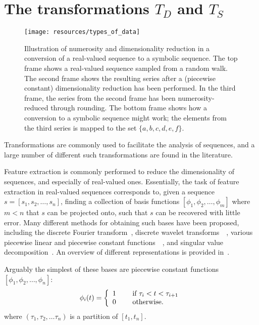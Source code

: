 \section{The transformations \texorpdfstring{$T_D$}{TD} and \texorpdfstring{$T_S$}{TS}}

\begin{figure}[htb]
  \begin{center}
    \leavevmode
    \texttt{[image: resources/types\_of\_data]}
  \end{center}
  \caption{\small{Illustration of numerosity and dimensionality reduction in a conversion of a real-valued sequence to a symbolic sequence. The top frame shows a real-valued sequence sampled from a random walk. The second frame shows the resulting series after a (piecewise constant) dimensionality reduction has been performed. In the third frame, the series from the second frame has been numerosity-reduced through rounding. The bottom frame shows how a conversion to a symbolic sequence might work; the elements from the third series is mapped to the set $\{a,b,c,d,e,f\}$.}}
\label{fig:types_of_data}
\end{figure}

Transformations are commonly used to facilitate the analysis of sequences, and a large number of different such transformations are found in the literature. 

Feature extraction is commonly performed to reduce the dimensionality of sequences, and especially of real-valued ones. Essentially, the task of feature extraction in real-valued sequences corresponds to, given a sequence $s = [s_1, s_2, \dots, s_n]$, finding a collection of basis functions $[\phi_1, \phi_2, \dots, \phi_m]$ where $m < n$ that $s$ can be projected onto, such that $s$ can be recovered with little error. Many different methods for obtaining such bases have been proposed, including the discrete Fourier transform~\cite{faloutsos1}, discrete wavelet transforms~\cite{pong}~\cite{fu}, various piecewise linear and piecewise constant functions~\cite{keogh3}~\cite{geurts}, and singular value decomposition~\cite{keogh3}. An overview of different representations is provided in~\cite{fabian}.

Arguably the simplest of these bases are piecewise constant functions $[\phi_1, \phi_2, \dots, \phi_n]$:
\[
  \phi_i(t) = \left\{
    \begin{array}{l l}
      1 & \quad \text{ if } \tau_i < t < \tau_{i+1} \\
      0 & \quad \text{ otherwise.} \\
    \end{array} \right.
\]
where $(\tau_1, \tau_2, \dots \tau_n)$ is a partition of $[t_1, t_n]$.

